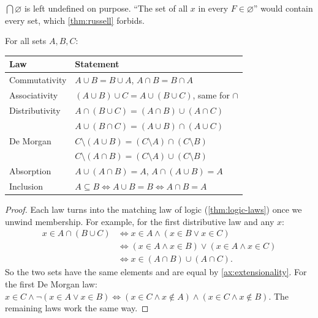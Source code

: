 \begin{remark}
$\bigcap \varnothing$ is left undefined on purpose. \enquote{The set of all $x$ in
every $F \in \varnothing$} would contain every set, which \cref{thm:russell}
forbids.
\end{remark}

\begin{theorem}
\label{thm:set-algebra}
For all sets $A, B, C$:
\begin{center}
\begin{tabular}{@{}ll@{}}
  \toprule
  Law & Statement \\
  \midrule
  Commutativity & $A \cup B = B \cup A$, \quad $A \cap B = B \cap A$ \\
  Associativity & $(A \cup B) \cup C = A \cup (B \cup C)$, \quad same for $\cap$ \\
  Distributivity & $A \cap (B \cup C) = (A \cap B) \cup (A \cap C)$ \\
    & $A \cup (B \cap C) = (A \cup B) \cap (A \cup C)$ \\
  De Morgan & $C \setminus (A \cup B) = (C \setminus A) \cap (C \setminus B)$ \\
    & $C \setminus (A \cap B) = (C \setminus A) \cup (C \setminus B)$ \\
  Absorption & $A \cup (A \cap B) = A$, \quad $A \cap (A \cup B) = A$ \\
  Inclusion & $A \subseteq B \Leftrightarrow A \cup B = B \Leftrightarrow A \cap B = A$ \\
  \bottomrule
\end{tabular}
\end{center}
\end{theorem}

\begin{proof}
Each law turns into the matching law of logic (\cref{thm:logic-laws}) once we
unwind membership. For example, for the first distributive law and any $x$:
\begin{align*}
  x \in A \cap (B \cup C)
  &\Leftrightarrow x \in A \land (x \in B \lor x \in C) \\
  &\Leftrightarrow (x \in A \land x \in B) \lor (x \in A \land x \in C) \\
  &\Leftrightarrow x \in (A \cap B) \cup (A \cap C).
\end{align*}
So the two sets have the same elements and are equal by
\cref{ax:extensionality}. For the first De Morgan law: $x \in C \land \lnot(x \in
A \lor x \in B) \Leftrightarrow (x \in C \land x \notin A) \land (x \in C \land x
\notin B)$. The remaining laws work the same way.
\end{proof}

